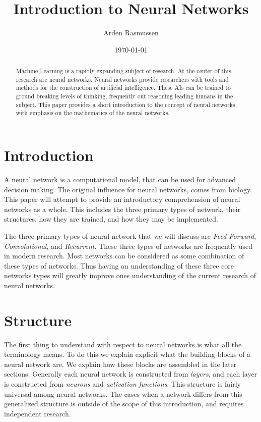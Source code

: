 \documentclass[10pt]{amsart}
\title{Introduction to Neural Networks}
\author{Arden Rasmussen}
\date{\today}
\begin{document}
\maketitle

\begin{abstract}
  Machine Learning is a rapidly expanding subject of research. At the center of
  this research are neural networks. Neural networks provide researchers with
  tools and methods for the construction of artificial intelligence. These
  AIs can be trained to ground breaking levels of thinking, frequently out
  reasoning leading humans in the subject. This paper provides a short
  introduction to the concept of neural networks, with emphasis on the
  mathematics of the neural networks.
\end{abstract}

\begin{multicols}{2}
  \section{Introduction}%
  \label{sec:introduction}

  A neural network is a computational model, that can be used for advanced
  decision making. The original influence for neural networks, comes from
  biology. This paper will attempt to provide an introductory comprehension of
  neural networks as a whole. This includes the three primary types of network,
  their structures, how they are trained, and how they may be implemented.

  The three primary types of neural network that we will discuss are
  \textit{Feed Forward}, \textit{Convolutional}, and \textit{Recurrent}. These
  three types of networks are frequently used in modern research. Most networks
  can be considered as some combination of these types of networks. Thus having
  an understanding of these three core networks types will greatly improve ones
  understanding of the current research of neural networks.

  \section{Structure}%
  \label{sec:structure}

  The first thing to understand with respect to neural networks is what all the
  terminology means. To do this we explain explicit what the building blocks
  of a neural network are. We explain how these blocks are assembled in the
  later sections. Generally each neural network is constructed from
  \textit{layers},  and each layer is constructed from \textit{neurons} and
  \textit{activation functions}. This structure is fairly universal among
  neural networks. The cases when a network differs from this generalized
  structure is outside of the scope of this introduction, and requires
  independent research.


\end{multicols}
\end{document}
